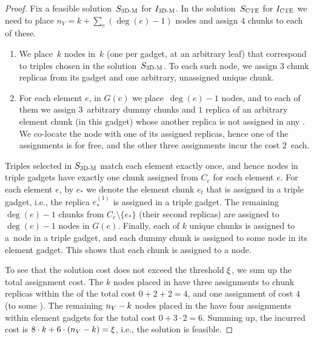 \begin{proof}
  Fix a feasible solution~$S_{\mathrm{\textsc{3D-M}}}$ for $I_{\mathrm{\textsc{3D-M}}}$. In the solution~$S_{\mathrm{\textsc{CTE}}}$ for $I_{\mathrm{\textsc{CTE}}}$ we need to place $n_V = k + \sum_e(\deg(e) - 1)$ nodes and assign $4$ chunks to each of these.
  \begin{enumerate}
    \item We place~$k$ nodes in~$k$ {\TripleGadgets} (one per gadget, at an arbitrary leaf) that correspond to triples chosen in the solution~$S_{\mathrm{\textsc{3D-M}}}$.
    To each such node, we assign $3$ chunk replicas from its gadget and one arbitrary, unassigned unique chunk.
    \item For each element $e$, in $G(e)$ we place~$\deg(e) - 1$ nodes, and to each of them we assign $3$~arbitrary dummy chunks and $1$ replica of an arbitrary 
    element chunk (in this
    gadget) whose another replica is not assigned in any {\TripleGadget}.
    We co-locate the node with one of its assigned replicas, hence one of the assignments is for free, and the other three assignments incur the cost $2$~each.
  \end{enumerate}
  Triples selected in $S_{\mathrm{\textsc{3D-M}}}$ match each element exactly once,
  and hence nodes in triple gadgets have exactly one chunk assigned from $C_e$ for each element $e$.
  For each element $e$, by $e_*$ we denote the element chunk $e_t$ that is assigned in a triple gadget, i.e., the replica $e_*^{(1)}$ is assigned in a triple gadget.
  The remaining $\deg(e)-1$ chunks from $C_e \setminus \{ e_* \}$ (their second replicas) are assigned to $\deg(e)-1$ nodes in $G(e)$.
  Finally, each of $k$ unique chunks is assigned to a~node in a triple gadget, and each dummy chunk is assigned to some node in its element gadget.
  This shows that each chunk is assigned to a node.
  
  To see that the solution cost does not exceed the threshold $\xi$, we sum up the total assignment cost.
  The $k$ nodes placed in \TripleGadgets{} have three assignments to chunk replicas within the \TripleGadget{} of the total cost $0+2+2=4$, and one assignment of cost $4$ (to some \UnqGadget{}).
  The remaining $n_V-k$ nodes placed in the \CoverSubtree{} have four assignments within element gadgets for the total cost $0+3\cdot 2 = 6$.
  Summing up, the incurred cost is $8\cdot k + 6\cdot (n_V - k) = \xi$, i.e., the solution is feasible.
\end{proof}

